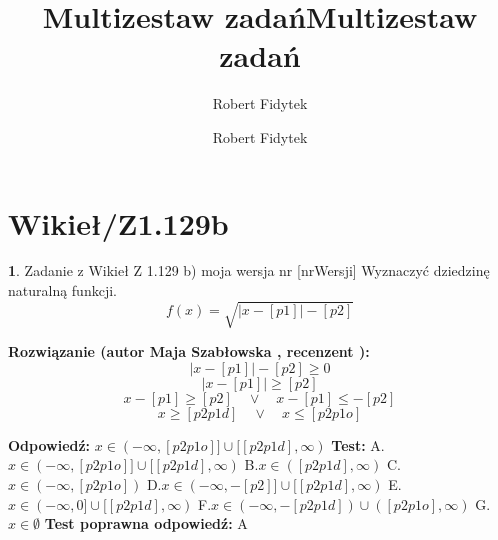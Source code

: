 \documentclass[12pt, a4paper]{article}
\title{Multizestaw zadań}
\author{Robert Fidytek}
\date{}\documentclass[12pt, a4paper]{article}
\title{Multizestaw zadań}
\author{Robert Fidytek}
\date{}
\theoremstyle{definition} %
\newtheorem{zad}{}
\theoremstyle{definition} %
\newtheorem{zad}{}
\newcommand{\kategoria}[1]{\section{#1}} %
\newcommand{\zadStart}[1]{\begin{zad}#1\newline} %
\newcommand{\zadStop}{\end{zad}}   %
\newcommand{\rozwStart}[2]{\noindent \textbf{Rozwiązanie (autor #1 , recenzent #2): }\newline} %
\newcommand{\rozwStop}{\newline}                                            %
\newcommand{\odpStart}{\noindent \textbf{Odpowiedź:}\newline}    %
\newcommand{\odpStop}{\newline}                                             %
\newcommand{\testStart}{\noindent \textbf{Test:}\newline} %
\newcommand{\testStop}{\newline} %
\newcommand{\kluczStart}{\noindent \textbf{Test poprawna odpowiedź:}\newline} %
\newcommand{\kluczStop}{\newline} %
\begin{document}
\maketitle


\kategoria{Wikieł/Z1.129b}
\zadStart{Zadanie z Wikieł Z 1.129 b) moja wersja nr [nrWersji]}
Wyznaczyć dziedzinę naturalną funkcji.
$$f(x)=\sqrt{|x-[p1]|-[p2]}$$
\zadStop

\rozwStart{Maja Szabłowska}{}
$$|x-[p1]|-[p2]\geq 0$$
$$|x-[p1]|\geq [p2]$$
$$x-[p1]\geq[p2] \quad \lor \quad x-[p1]\leq-[p2]$$
$$x\geq[p2p1d] \quad \lor \quad x\leq[p2p1o] $$

\rozwStop
\odpStart
$x\in(-\infty, [p2p1o]] \cup [[p2p1d],\infty)$
\odpStop
\testStart
A.$x\in(-\infty, [p2p1o]] \cup [[p2p1d],\infty)$
B.$x\in([p2p1d],\infty)$
C.$x\in(-\infty, [p2p1o])$
D.$x\in(-\infty, -[p2]] \cup [[p2p1d],\infty)$
E.$x\in(-\infty, 0] \cup [[p2p1d],\infty)$
F.$x\in(-\infty, -[p2p1d]) \cup ([p2p1o],\infty)$
G.$x\in\emptyset$
\testStop
\kluczStart
A
\kluczStop
\end{document}
